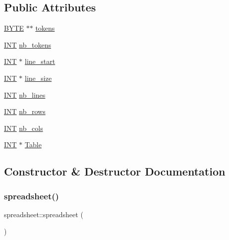 \subsection*{Public Attributes}
\begin{DoxyCompactItemize}
\item 
\mbox{\hyperlink{galois_8h_ab6cc7b4aeb6ea31aba2b3fbfc83ff5e6}{B\+Y\+TE}} $\ast$$\ast$ \mbox{\hyperlink{classspreadsheet_a8acb382067a33659e785e31966efedcf}{tokens}}
\item 
\mbox{\hyperlink{galois_8h_a09fddde158a3a20bd2dcadb609de11dc}{I\+NT}} \mbox{\hyperlink{classspreadsheet_a6226efe57e0906c34ba532bf4634112a}{nb\+\_\+tokens}}
\item 
\mbox{\hyperlink{galois_8h_a09fddde158a3a20bd2dcadb609de11dc}{I\+NT}} $\ast$ \mbox{\hyperlink{classspreadsheet_a3ac952c24eabd55d15e725d608c5e8c9}{line\+\_\+start}}
\item 
\mbox{\hyperlink{galois_8h_a09fddde158a3a20bd2dcadb609de11dc}{I\+NT}} $\ast$ \mbox{\hyperlink{classspreadsheet_a40d427b8b590bd243db17fedddb7667e}{line\+\_\+size}}
\item 
\mbox{\hyperlink{galois_8h_a09fddde158a3a20bd2dcadb609de11dc}{I\+NT}} \mbox{\hyperlink{classspreadsheet_aca305195cc23be3cc05cd28c9112814c}{nb\+\_\+lines}}
\item 
\mbox{\hyperlink{galois_8h_a09fddde158a3a20bd2dcadb609de11dc}{I\+NT}} \mbox{\hyperlink{classspreadsheet_ab45da267ca261169cd72a7f7a8195efe}{nb\+\_\+rows}}
\item 
\mbox{\hyperlink{galois_8h_a09fddde158a3a20bd2dcadb609de11dc}{I\+NT}} \mbox{\hyperlink{classspreadsheet_a7914db2e3cf1e0a361e52107c4890ad1}{nb\+\_\+cols}}
\item 
\mbox{\hyperlink{galois_8h_a09fddde158a3a20bd2dcadb609de11dc}{I\+NT}} $\ast$ \mbox{\hyperlink{classspreadsheet_a8b3b507fc2767371b443b9fe380804cb}{Table}}
\end{DoxyCompactItemize}


\subsection{Constructor \& Destructor Documentation}
\mbox{\label{classspreadsheet_a7b5f23e44aff5488302e827e33a1fad5}} 
\subsubsection{\texorpdfstring{spreadsheet()}{spreadsheet()}}
{\footnotesize\ttfamily spreadsheet\+::spreadsheet (\begin{DoxyParamCaption}{ }\end{DoxyParamCaption})}

